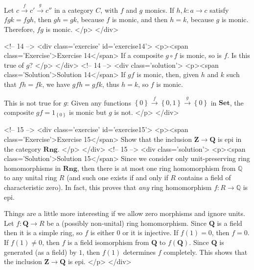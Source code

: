 Let $c\overset{f}{\to}c'\overset{g}{\to}c''$ in a category $C$, with $f$ and $g$ monics. If $h,k:a\to c$ satisfy $fgk=fgh$, then $gh=gk$, because $f$ is monic, and then $h=k$, because $g$ is monic. Therefore, $fg$ is monic.
</p>
</div>

<!-- 14 -->
<div class='exercise' id='exercise14'>
<p><span class='Exercise'>Exercise 14</span>
If a composite $g\circ f$ is monic, so is $f$. Is this true of $g$?
</p>
</div>
<!-- 14 -->
<div class='solution'>
<p><span class='Solution'>Solution 14</span>
If $gf$ is monic, then, given $h$ and $k$ such that $fh=fk$, we have $gfh=gfk$, thus $h=k$, so $f$ is monic.

This is not true for $g$: Given any functions $\left\{0\right\}\overset{f}{\to}\left\{0,1\right\}\overset{g}{\to}\left\{0\right\}$ in $\mathbf{Set}$, the composite $gf=1_{\left\{0\right\}}$ is monic but $g$ is not.
</p>
</div>

<!-- 15 -->
<div class='exercise' id='exercise15'>
<p><span class='Exercise'>Exercise 15</span>
Show that the inclusion $\mathbf{Z}\to\mathbf{Q}$ is epi in the category $\mathbf{Rng}$.
</p>
</div>
<!-- 15 -->
<div class='solution'>
<p><span class='Solution'>Solution 15</span>
Since we consider only unit-preserving ring homomorphisms in $\mathbf{Rng}$, then there is at most one ring homomorphism from $\mathbb{Q}$ to any unital ring $R$ (and such one exists if and only if $R$ contains a field of characteristic zero). In fact, this proves that \emph{any} ring homomorphism $f\colon R\to\mathbb{Q}$ is epi.

Things are a little more interesting if we allow zero morphisms and ignore units. Let $f:\mathbf{Q}\to R$ be a (possibly non-unital) ring homomorphism. Since $\mathbf{Q}$ is a field then it is a simple ring, so $f$ is either $0$ or it is injective. If $f(1)=0$, then $f=0$. If $f(1)\neq 0$, then $f$ is a field isomorphism from $\mathbf{Q}$ to $f(\mathbf{Q})$. Since $\mathbf{Q}$ is generated (as a field) by $1$, then $f(1)$ determines $f$ completely. This shows that the inclusion $\mathbf{Z}\to\mathbf{Q}$ is epi.
</p>
</div>

